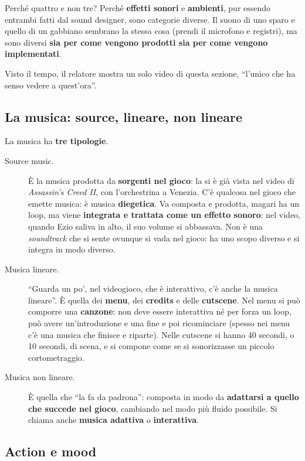 Perché quattro e non tre? Perché \textbf{effetti sonori} e \textbf{ambienti},
pur essendo entrambi fatti dal sound designer, sono categorie diverse. Il suono di
uno sparo e quello di un gabbiano sembrano la stessa cosa (prendi il microfono e
registri), ma sono diversi \textbf{sia per come vengono prodotti sia per come
vengono implementati}.

Visto il tempo, il relatore mostra un solo video di questa sezione, ``l'unico
che ha senso vedere a quest'ora''.

\subsection{La musica: source, lineare, non lineare}

La musica ha \textbf{tre tipologie}.

\begin{description}
  \item[Source music.] È la musica prodotta da \textbf{sorgenti nel gioco}: la si
        è già vista nel video di \emph{Assassin's Creed II}, con l'orchestrina a
        Venezia. C'è qualcosa nel gioco che emette musica: è musica
        \textbf{diegetica}. Va composta e prodotta, magari ha un loop, ma viene
        \textbf{integrata e trattata come un effetto sonoro}: nel video, quando
        Ezio saliva in alto, il suo volume si abbassava. Non è una
        \emph{soundtrack} che si sente ovunque si vada nel gioco: ha uno scopo
        diverso e si integra in modo diverso.
  \item[Musica lineare.] ``Guarda un po', nel videogioco, che è interattivo, c'è
        anche la musica lineare''. È quella dei \textbf{menu}, dei
        \textbf{credits} e delle \textbf{cutscene}. Nel menu si può comporre una
        \textbf{canzone}: non deve essere interattiva né per forza un loop, può
        avere un'introduzione e una fine e poi ricominciare (spesso nei menu c'è
        una musica che finisce e riparte). Nelle cutscene si hanno 40 secondi, o
        10 secondi, di scena, e si compone come se si sonorizzasse un piccolo
        cortometraggio.
  \item[Musica non lineare.] È quella che ``la fa da padrona'': composta in modo
        da \textbf{adattarsi a quello che succede nel gioco}, cambiando nel modo
        più fluido possibile. Si chiama anche \textbf{musica adattiva} o
        \textbf{interattiva}.
\end{description}

\subsection{Action e mood}

